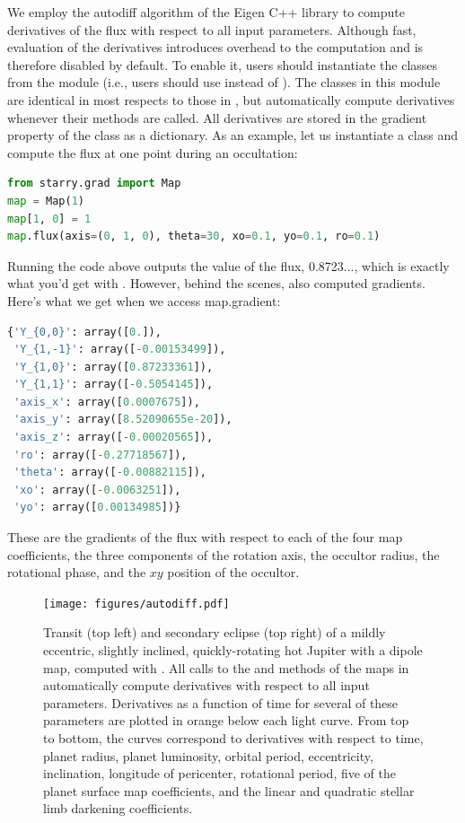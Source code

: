 \documentclass[modern]{aastex61}
\begin{document}
We employ the autodiff algorithm of the Eigen \citep{eigen} C++ library to compute
derivatives of the flux with respect to all input parameters. Although fast,
evaluation of the derivatives introduces overhead to the computation
and is therefore disabled by default. To enable it, users should instantiate the
\starry classes from the \starrygrad module (i.e., users should use
\gradMap instead of \starryMap). The classes in this module are
identical in most respects to those in \starry, but automatically compute derivatives
whenever their methods are called. All derivatives are stored in the \textsf{gradient}
property of the class as a dictionary. As an example, let us instantiate a \gradMap
class and compute the flux at one point during an occultation:
%
\begin{lstlisting}[language=Python,firstnumber=last]
from starry.grad import Map
map = Map(1)
map[1, 0] = 1
map.flux(axis=(0, 1, 0), theta=30, xo=0.1, yo=0.1, ro=0.1)
\end{lstlisting}
%
Running the code above outputs the value of the flux, \textsf{0.8723...},
which is exactly what you'd get with \starryMap. However, behind the scenes,
\starry also computed gradients. Here's what we get when we access \textsf{map.gradient}:
%
\begin{lstlisting}[language=Python,firstnumber=last]
{'Y_{0,0}': array([0.]),
 'Y_{1,-1}': array([-0.00153499]),
 'Y_{1,0}': array([0.87233361]),
 'Y_{1,1}': array([-0.5054145]),
 'axis_x': array([0.0007675]),
 'axis_y': array([8.52090655e-20]),
 'axis_z': array([-0.00020565]),
 'ro': array([-0.27718567]),
 'theta': array([-0.00882115]),
 'xo': array([-0.0063251]),
 'yo': array([0.00134985])}
\end{lstlisting}
%
These are the gradients of the flux with respect to each of the four map
coefficients, the three components of the rotation axis, the occultor radius,
the rotational phase, and the $xy$ position of the occultor.
%
\begin{figure}[p!]
    \begin{centering}
    \texttt{[image: figures/autodiff.pdf]}
    \caption{\label{fig:autodiff}
             Transit (top left) and secondary eclipse (top right) of a mildly
             eccentric, slightly inclined, quickly-rotating hot Jupiter with a
             dipole map, computed with \gradMap. All calls to the \gradflux
             and \gradeval methods of the maps in \starrygrad automatically
             compute derivatives with respect to all input parameters. Derivatives
             as a function of time for several of these parameters are plotted in
             orange below each light curve. From top to bottom, the curves correspond
             to derivatives with respect to time, planet radius, planet luminosity,
             orbital period, eccentricity, inclination, longitude of pericenter,
             rotational period, five of the planet surface map coefficients, and
             the linear and quadratic stellar limb darkening coefficients.
             }
    \end{centering}
\end{figure}
\end{document}
